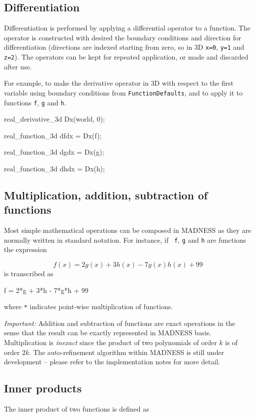 \documentclass[letterpaper]{article}
\begin{document}
\subsection{Differentiation}
Differentiation is performed by applying a differential operator to a function. The operator is constructed with desired
the boundary conditions and direction for differentiation (directions are indexed starting from zero, so in 3D
\texttt{x=0}, \texttt{y=1} and \texttt{z=2}). The operators can be kept for repeated application, or made and discarded
after use.

For example, to make the derivative operator in 3D with respect to the first variable using boundary conditions from
\texttt{FunctionDefaults}, and to apply it to functions \texttt{f}, \texttt{g} and \texttt{h}.

{\ttfamily
real\_derivative\_3d Dx(world, 0);}

{\ttfamily
real\_function\_3d dfdx = Dx(f);}

{\ttfamily
real\_function\_3d dgdx = Dx(g);}

{\ttfamily
real\_function\_3d dhdx = Dx(h);}

\subsection{Multiplication, addition, subtraction of functions}
Most simple mathematical operations can be composed in MADNESS as they are normally written in standard notation. For
instance, if \ \texttt{f}, \texttt{g} and \texttt{h} are functions the expression 

\begin{equation}
f(x)=2g(x)+3h(x)-7g(x)h(x)+99
\end{equation}
is transcribed as

{\ttfamily
f = 2*g + 3*h - 7*g*h + 99}

where \texttt{*} indicates point-wise multiplication of functions.

\textit{Important: }Addition and subtraction of functions are exact operations in the sense that the result can be
exactly represented in MADNESS basis. Multiplication is \textit{inexact} since the product of two polynomials of order 
$k$ is of order  $2k$. The auto-refinement algorithm within MADNESS is still under development -- please refer to the
implementation notes for more detail.

\subsection{Inner products}
The inner product of two functions is defined as 
\end{document}
